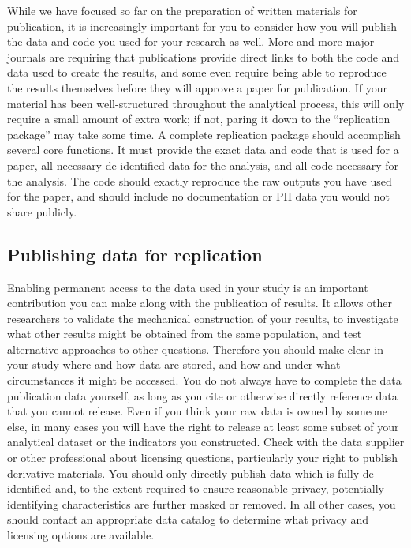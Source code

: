 While we have focused so far on the preparation of written materials for publication,
it is increasingly important for you to consider how you will publish
the data and code you used for your research as well.
More and more major journals are requiring that publications
provide direct links to both the code and data used to create the results,
and some even require being able to reproduce the results themselves
before they will approve a paper for publication.
If your material has been well-structured throughout the analytical process,
this will only require a small amount of extra work;
if not, paring it down to the ``replication package'' may take some time.
A complete replication package should accomplish several core functions.
It must provide the exact data and code that is used for a paper,
all necessary de-identified data for the analysis,
and all code necessary for the analysis.
The code should exactly reproduce the raw outputs you have used for the paper,
and should include no documentation or PII data you would not share publicly.

\subsection{Publishing data for replication}

Enabling permanent access to the data used in your study
is an important contribution you can make along with the publication of results.
It allows other researchers to validate the mechanical construction of your results,
to investigate what other results might be obtained from the same population,
and test alternative approaches to other questions.
Therefore you should make clear in your study
where and how data are stored, and how and under what circumstances it might be accessed.
You do not always have to complete the data publication data yourself,
as long as you cite or otherwise directly reference data that you cannot release.
Even if you think your raw data is owned by someone else,
in many cases you will have the right to release
at least some subset of your analytical dataset or the indicators you constructed.
Check with the data supplier or other professional about licensing questions,
particularly your right to publish derivative materials.
You should only directly publish data which is fully de-identified
and, to the extent required to ensure reasonable privacy,
potentially identifying characteristics are further masked or removed.
In all other cases, you should contact an appropriate data catalog
to determine what privacy and licensing options are available.

